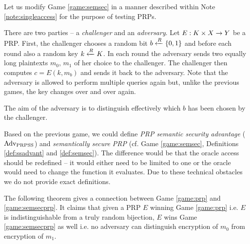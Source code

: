 Let us modify Game \ref{game:semsec} in a manner described within Note \ref{note:singleaccess} for the purpose of testing PRPs.

\begin{game}
\label{game:semsecprp}
	There are two parties -- a {\em challenger} and an {\em adversary}. Let $E:K\times X\rightarrow Y$ be a PRP. First, the challenger chooses a random bit $b\xleftarrow{R}\{0,1\}$ and before each round also a random key $k\xleftarrow{R} K$. In each round the adversary sends two equally long plaintexts $m_0$, $m_1$ of her choice to the challenger. The challenger then computes $c = E(k,m_b)$ and sends it back to the adversary. Note that the adversary is allowed to perform multiple queries again but, unlike the previous games, the key changes over and over again.
	
	The aim of the adversary is to distinguish effectively which $b$ has been chosen by the challenger.
\end{game}

\begin{note}
\label{note:semsecprp}
	Based on the previous game, we could define {\em PRP semantic security advantage} ($\operatorname*{Adv_{PRPSS}}$) and {\em semantically secure PRP} (cf. Game \ref{game:semsec}, Definitions \ref{def:ssadvant} and \ref{def:semsec}). The difference would be that the oracle access should be redefined -- it would either need to be limited to one or the oracle would need to change the function it evaluates. Due to these technical obstacles we do not provide exact definitions.
\end{note}

The following theorem gives a connection between Game \ref{game:prp} and \ref{game:semsecprp}. It claims that given a PRP $E$ winning Game \ref{game:prp} i.e. $E$ is indistinguishable from a truly random bijection, $E$ wins Game \ref{game:semsecprp} as well i.e. no adversary can distinguish encryption of $m_0$ from encryption of $m_1$.

